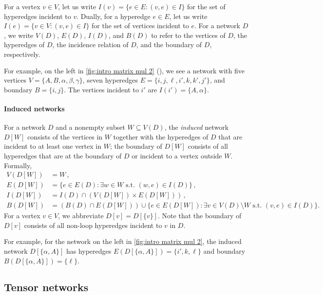 \documentclass{toc}
\begin{document}
For a vertex $v\in V$, let us write $I(v)=\{e\in E:(v,e)\in I\}$
for the set of hyperedges incident to $v$. Dually, for a hyperedge $e\in E$, let
us write $I(e)=\{v\in V:(v,e)\in I\}$ for the set of vertices incident to $e$.
For a network $D$, we write $V(D)$, $E(D)$, $I(D)$, and $B(D)$ to
refer to the vertices of $D$, the hyperedges of $D$, the incidence relation
of $D$, and the boundary of $D$, respectively.

For example, on the left in \eqref{fig:intro matrix mul 2} (),
we see a network with five vertices $V = \{A, B, \alpha, \beta, \gamma\}$,
seven hyperedges $E = \{i, j, \ell, i', k, k', j'\}$, and boundary $B =
\{i, j\}$.  The vertices incident to $i'$ are $I(i') = \{A, \alpha\}$.

\paragraph*{Induced networks}
For a network $D$ and a nonempty subset $W\subseteq V(D)$,
the \emph{induced} network $D[W]$ consists of the vertices in $W$ together with the hyperedges of
$D$ that are incident to at least one vertex in $W$; the boundary of
$D[W]$ consists of all hyperedges that are at the boundary of $D$
or incident to a vertex outside $W$.  Formally,
\begin{equation}
\label{eq:induced}
\begin{aligned}
  V(D[W])&=W\,,\\
  E(D[W])&=\{e\in E(D):\text{$\exists w \in W$ s.t.~$(w,e)\in I(D)$}\}\,,\\
  I(D[W])&=I(D)\cap\left(V(D[W])\times E(D[W])\right)\,,\\
  B(D[W])&=\left(B(D)\cap E(D[W])\right)\cup
  \{e\in E(D[W])\!:\text{$\exists v \in V(D) \!\setminus\! W$ s.t.~$(v,e)\in I(D)$}\}.
\end{aligned}
\end{equation}
For a vertex $v\in V$, we abbreviate $D[v]=D[\{v\}]$.
Note that the boundary of $D[v]$ consists of all non-loop
hyperedges incident to $v$ in $D$.

For example, for the network on the left in \eqref{fig:intro matrix
  mul 2}, the induced network $D[\{\alpha, A\}]$ has hyperedges $E(D[\{\alpha, A\}]) = \{i',k, \ell\}$ and boundary $B(D[\{\alpha,A\}]) = \{\ell\}$.

\subsection{Tensor networks}
\end{document}

